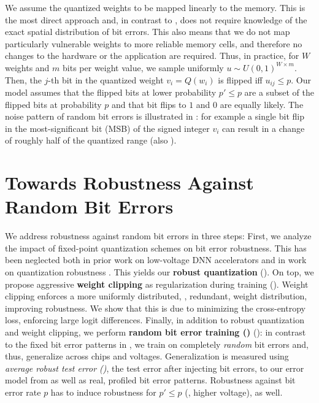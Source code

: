 We assume the quantized weights to be mapped linearly to the memory. This is the most direct approach and, in contrast to \cite{KoppulaMICRO2019}, does not require knowledge of the exact spatial distribution of bit errors. This also means that we do not map particularly vulnerable weights to more reliable memory cells, and therefore no changes to the hardware or the application are required. Thus, in practice, for $W$ weights and $m$ bits per weight value, we sample uniformly $u \sim U(0, 1)^{W \times m}$. Then, the $j$-th bit in the quantized weight $v_i = Q(w_i)$ is flipped iff $u_{ij} \leq p$.
Our model assumes that the flipped bits at lower probability $p' \leq p$ are a subset of the flipped bits at probability $p$ and that bit flips to $1$ and $0$ are equally likely. The noise pattern of random bit errors is illustrated in : 
for example a single bit flip in the most-significant bit (MSB) of the signed integer $v_i$ can result in a change of roughly half of the quantized range (also \cf {}).

\section{Towards Robustness Against Random Bit Errors}
\label{sec:robustness}

We address robustness against random bit errors in three steps: First, we analyze the impact of fixed-point quantization schemes on bit error robustness. This has been neglected both in prior work on low-voltage DNN accelerators \cite{KimDATE2018,KoppulaMICRO2019} and in work on quantization robustness \cite{MurthyARXIV2019,MerollaARXIV2016,SungARXIV2015}. This yields our \textbf{robust quantization} (). On top, we propose aggressive \textbf{weight clipping} as regularization during training (). 
Weight clipping enforces a more uniformly distributed, \ie, redundant, weight distribution, improving robustness. We show that this is due to minimizing the cross-entropy loss, enforcing large logit differences.
Finally, in addition to robust quantization and weight clipping, we perform \textbf{random bit error training (\Random)} (): in contrast to the fixed bit error patterns in \cite{KimDATE2018,KoppulaMICRO2019}, we train on completely \emph{random} bit errors and, thus, generalize across chips and voltages.
Generalization is measured using \emph{average robust test error (\RTE)}, the test error after injecting bit errors, \wrt to our error model from  as well as real, profiled bit error patterns. %
Robustness against bit error rate $p$ has to induce robustness for $p' \leq p$ (\ie, higher voltage), as well.

